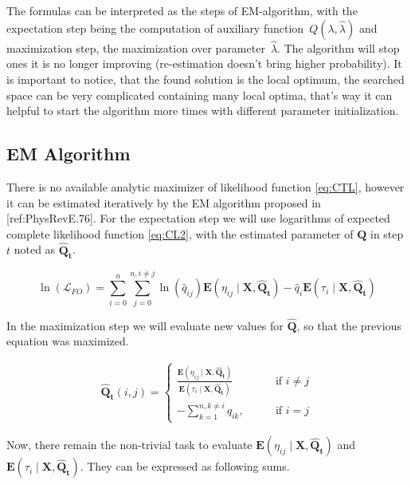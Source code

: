 \documentclass[thesis=M,english]{FITthesis}[2012/10/20]
\newcommand{\matr}[1]{\mathbf{#1}}
\begin{document}

The formulas can be interpreted as the steps of EM-algorithm, with the expectation step being the computation of auxiliary function~$Q(\lambda,\hat\lambda)$ and maximization step, the maximization over parameter~$\hat\lambda$. The algorithm will stop ones it is no longer improving (re-estimation doesn't bring higher probability). It is important to notice, that the found solution is the local optimum, the searched space can be very complicated containing many local optima, that's way it can helpful to start the algorithm more times with different parameter initialization.  


\subsection{EM Algorithm} 

There is no available analytic maximizer of likelihood function \eqref{eq:CTL}, however it can be estimated iteratively by the EM algorithm proposed in [ref:PhysRevE.76].  
For the expectation step we will use logarithms of expected complete likelihood function \eqref{eq:CL2}, with the estimated parameter of $\matr{Q}$ in step $t$ noted as $\matr{ \hat Q_t } $.

\begin{equation}\label{eq:EMCL}
 \ln( \mathcal{L}_{FO} ) = \sum_{i=0}^n \sum_{j=0}^{n, i \neq j} \ln( \hat q_{ij}) \mathbf{E}( \eta_{ij} \mid \matr{X}, \matr{ \hat Q_t } ) - \hat q_i \mathbf{E}( \tau_i \mid \matr{X}, \matr{ \hat Q_t } )
\end{equation}

In the maximization step we will evaluate new values for $\matr{ \hat Q }$, so that the previous equation was maximized. 

\begin{equation}
\begin{aligned}  
\matr{ \hat Q_t }(i,j)= 
\begin{cases}
\frac{ \mathbf{E}(\eta_{ij} \mid \matr{X}, \matr{ \hat Q_t } )}{ \mathbf{E}( \tau_i \mid \matr{X}, \matr{\hat Q_t} ) } & \text{if } i\neq j\\
- \sum\limits_{k=1}^{n,k \neq i} q_{ik}, \qquad & \text{if } i=j
\end{cases}
\end{aligned}
\end{equation}

Now, there remain the non-trivial task to evaluate $\mathbf{E}( \eta_{ij} \mid \matr{X}, \matr{\hat Q_t} )$ and $\mathbf{E}( \tau_i \mid \matr{X}, \matr{ \hat Q_t } )$. They can be expressed as following sums.
\end{document}
